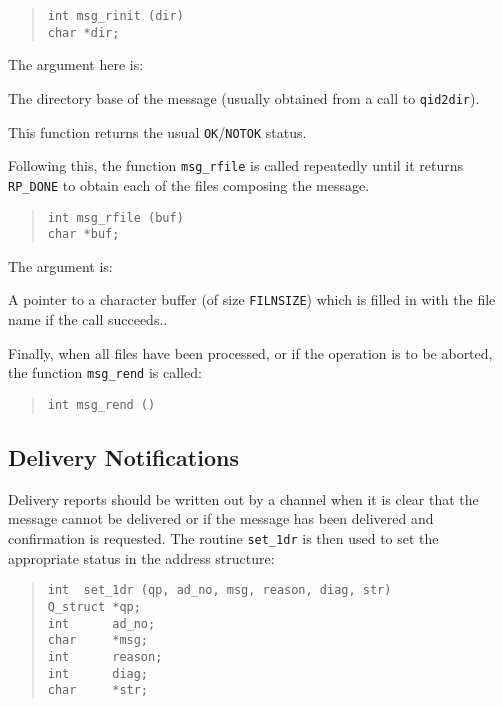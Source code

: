 \begin{quote}\begin{verbatim}
int msg_rinit (dir)
char *dir;
\end{verbatim}\end{quote}

The argument here is:
\begin{describe}
\item[\verb|dir|:]	The directory base of the message (usually
obtained from a call to \verb|qid2dir|).
\end{describe}

This function returns the usual \verb|OK|/\verb|NOTOK| status.

Following this, the function \verb|msg_rfile| is called repeatedly
until it returns \verb|RP_DONE| to obtain each of the files composing
the message.
\begin{quote}\begin{verbatim}
int msg_rfile (buf)
char *buf;
\end{verbatim}\end{quote}
The argument is:
\begin{describe}
\item[\verb|buf|:] A pointer to a character buffer (of size
\verb|FILNSIZE|) which is filled in with the file name if the call succeeds..
\end{describe}

Finally, when all files have been processed, or if the operation is to
be aborted, the function \verb|msg_rend| is called:
\begin{quote}\begin{verbatim}
int msg_rend ()
\end{verbatim}\end{quote}

\subsection {Delivery Notifications}\label{set:dr}

Delivery reports should be written out by a channel when it is clear
that the message cannot be delivered or if the message has been
delivered and confirmation is requested. The routine
\verb|set_1dr| is then used to set the appropriate status in the
address structure:

\begin{quote}\begin{verbatim}
int  set_1dr (qp, ad_no, msg, reason, diag, str)
Q_struct *qp;
int      ad_no;
char 	 *msg;
int      reason;
int      diag;
char     *str;
\end{verbatim}\end{quote}

